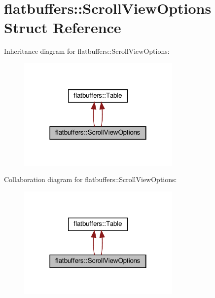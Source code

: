 \hypertarget{structflatbuffers_1_1ScrollViewOptions}{}\section{flatbuffers\+:\+:Scroll\+View\+Options Struct Reference}
\label{structflatbuffers_1_1ScrollViewOptions}


Inheritance diagram for flatbuffers\+:\+:Scroll\+View\+Options\+:
\nopagebreak
\begin{figure}[H]
\begin{center}
\leavevmode
\includegraphics[width=226pt]{structflatbuffers_1_1ScrollViewOptions__inherit__graph}
\end{center}
\end{figure}


Collaboration diagram for flatbuffers\+:\+:Scroll\+View\+Options\+:
\nopagebreak
\begin{figure}[H]
\begin{center}
\leavevmode
\includegraphics[width=226pt]{structflatbuffers_1_1ScrollViewOptions__coll__graph}
\end{center}
\end{figure}
